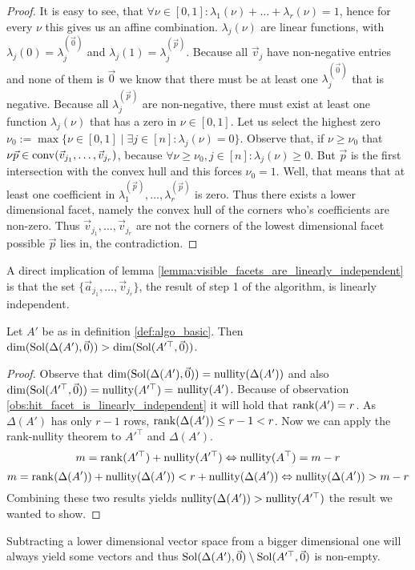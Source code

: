 \begin{proof}
    It is easy to see, that $\forall \nu\in[0, 1]: \lambda_1(\nu) + \dots + \lambda_r(\nu) = 1$, hence for every $\nu$ this gives us an affine combination. $\lambda_j(\nu)$ are linear functions, with $\lambda_j(0) = \lambda_j^{(\vec 0)}$ and $\lambda_j(1) = \lambda_j^{(\vec p)}$. Because all $\vec v_j$ have non-negative entries and none of them is $\vec 0$ we know that there must be at least one $\lambda_j^{(\vec 0)}$ that is negative. Because all $\lambda_j^{(\vec p)}$ are non-negative, there must exist at least one function $\lambda_j(\nu)$ that has a zero in $\nu \in [0, 1]$. Let us select the highest zero $\nu_0 := \max\{\nu \in [0, 1]\mid \exists j\in [n]\colon \lambda_j(\nu) = 0\}$. Observe that, if $\nu \geq \nu_0$ that $\nu\vec p \in \operatorname{conv}(\vec v_{j_1}, \dots, \vec v_{j_r})$, because $\forall \nu \geq \nu_0, j\in[n]\colon \lambda_j(\nu) \geq 0$. But $\vec p$ is the first intersection with the convex hull and this forces $\nu_0 = 1$. Well, that means that at least one coefficient in $\lambda^{(\vec p)}_1, \dots, \lambda^{(\vec p)}_r$ is zero. Thus there exists a lower dimensional facet, namely the convex hull of the corners who's coefficients are non-zero. Thus $\vec v_{j_1}, \dots, \vec v_{j_r}$ are not the corners of the lowest dimensional facet possible $\vec p$ lies in, the contradiction.
\end{proof}

\begin{observation}
    \label{obs:hit_facet_is_linearly_independent}
    A direct implication of lemma \ref{lemma:visible_facets_are_linearly_independent} is that the set $\{\vec a_{j_1}, \dots, \vec v_{j_r}\}$, the result of step 1 of the algorithm, is linearly independent.  
\end{observation}

\begin{lemma}
    \label{lemma:solspace_big_enough}
    Let $A'$ be as in definition \ref{def:algo_basic}. Then $\dim(\operatorname{Sol}(\Delta(A'), \vec0)) > \dim(\operatorname{Sol}(A'^\top, \vec0))$.
\end{lemma}
\begin{proof}
    Observe that $\dim(\operatorname{Sol}(\Delta(A'), \vec0)) = \operatorname{nullity}(\Delta(A'))$ and also $\dim(\operatorname{Sol}(A'^\top, \vec0)) = \operatorname{nullity}(A'^\top) =$ $\operatorname{nullity}(A')$. Because of observation \ref{obs:hit_facet_is_linearly_independent} it will hold that $\operatorname{rank}(A') = r$. As $\Delta(A')$ has only $r-1$ rows, $\operatorname{rank}(\Delta(A')) \leq r-1 < r$. Now we can apply the rank-nullity theorem to $A'^\top$ and $\Delta(A')$.
    $$m = \operatorname{rank}(A'^\top) + \operatorname{nullity}(A'^\top) \Leftrightarrow \operatorname{nullity}(A^\top) = m - r$$
    $$m = \operatorname{rank}(\Delta(A')) + \operatorname{nullity}(\Delta(A')) < r + \operatorname{nullity}(\Delta(A'))\Leftrightarrow \operatorname{nullity}(\Delta(A')) > m - r$$
    Combining these two results yields $\operatorname{nullity}(\Delta(A')) > \operatorname{nullity}(A'^\top)$ the result we wanted to show.
\end{proof}
Subtracting a lower dimensional vector space from a bigger dimensional one will always yield some vectors and thus $\operatorname{Sol}(\Delta(A'), \vec0) \setminus \operatorname{Sol}(A'^\top, \vec0)$ is non-empty.

